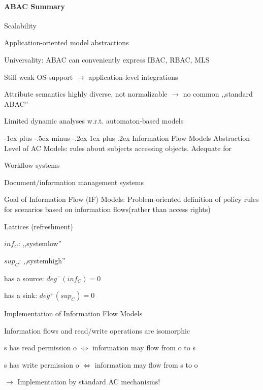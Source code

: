 \documentclass[a4paper]{article}
\makeatletter
\renewcommand{\subsubsection}{\@startsection{subsubsection}{3}{0mm}%
                {-1ex plus -.5ex minus -.2ex}%
                {1ex plus .2ex}%
                {\normalfont\small\bfseries}}
\makeatother
\begin{document}
\begin{multicols}{3}
    \paragraph{ABAC Summary}
    \begin{itemize*}
        \item Scalability
        \item Application-oriented model abstractions
        \item Universality: ABAC can conveniently express IBAC, RBAC, MLS
        \item Still weak OS-support $\rightarrow$ application-level integrations
        \item Attribute semantics highly diverse, not normalizable $\rightarrow$ no common ,,standard ABAC''
        \item Limited dynamic analyses w.r.t. automaton-based models
    \end{itemize*}

    \subsubsection{Information Flow Models}
    Abstraction Level of AC Models: rules about subjects accessing objects. Adequate for
    \begin{itemize*}
        \item Workflow systems
        \item Document/information management systems
    \end{itemize*}

    Goal of Information Flow (IF) Models: Problem-oriented definition of policy rules for scenarios based on information flows(rather than access rights)

    Lattices (refreshment)
    \begin{itemize*}
        \item $inf_C$: ,,systemlow''
        \item $sup_C$: ,,systemhigh''
        \item has a source: $deg^-(inf_C)= 0$
        \item has a sink: $deg^+(sup_C)= 0$
    \end{itemize*}

    Implementation of Information Flow Models
    \begin{itemize*}
        \item Information flows and read/write operations are isomorphic
        \begin{itemize*}
            \item s has read permission o $\Leftrightarrow$ information may flow from o to s
            \item s has write permission o $\Leftrightarrow$ information may flow from s to o
        \end{itemize*}
        \item[$\rightarrow$] Implementation by standard AC mechanisms!
    \end{itemize*}


\end{multicols}
\end{document}
